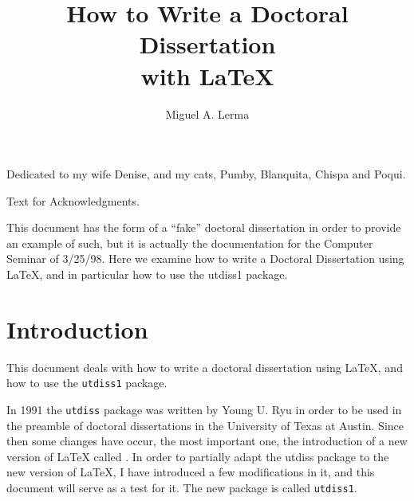 \documentclass[12pt]{report} %
\author{Miguel A. Lerma}  %
\title{How to Write a Doctoral Dissertation\\ with \LaTeX{}}
\theoremstyle{definition}
\theoremstyle{remark}
\begin{document}
\copyrightpage                  %

\titlepage                      %

\signaturepage                  %


\begin{dedication}              %
%
Dedicated to my wife Denise, and my cats, 
Pumby, Blanquita, Chispa and Poqui.
\end{dedication}


\begin{acknowledgments}
%
Text for Acknowledgments.
\end{acknowledgments}

\utabstract       %

This document has the form of a ``fake'' doctoral dissertation
in order to provide an example of such, but it is actually the 
documentation for the Computer Seminar of 
3/25/98.
Here we examine how to write a Doctoral Dissertation using 
\LaTeX{}, and in particular how to use the utdiss1 package. 


\tableofcontents        %

\listoftables           %

\listoffigures          %






\chapter{Introduction}
%


This document deals with how to write a doctoral dissertation 
using \LaTeX{}, and how to use the \texttt{utdiss1} package. 
%

In 1991 the \texttt{utdiss} package was written by Young U. Ryu 
%
in order to be used in the preamble of doctoral dissertations in 
the University of Texas at Austin. 
%
Since then some changes have 
occur, the most important one, the introduction of 
a new version of \LaTeX{} 
%
called \LaTeXe{}. 
%
In order to partially adapt the utdiss package to the 
new version of \LaTeX{}, I have introduced a few modifications 
in it, and this document will serve as a test for it. The 
new package is called \texttt{utdiss1}.
%
\end{document}
